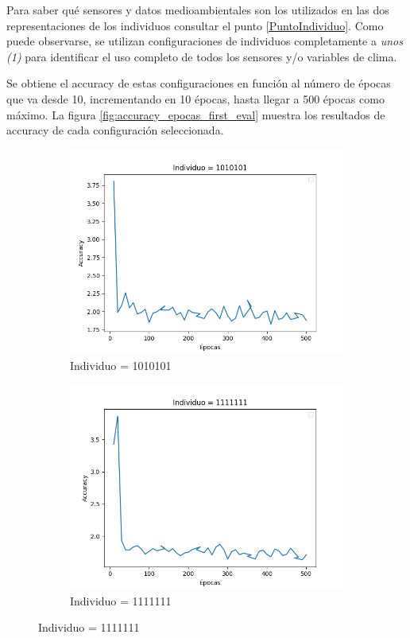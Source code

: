 Para saber qué sensores y datos medioambientales son los utilizados en las dos representaciones de los individuos consultar el punto \ref{PuntoIndividuo}. Como puede observarse, se utilizan configuraciones de individuos completamente a \textit{unos (1)} para identificar el uso completo de todos los sensores y/o variables de clima.


Se obtiene el accuracy de estas configuraciones en función al número de épocas que va desde 10, incrementando en 10 épocas, hasta llegar a 500 épocas como máximo. La figura \ref{fig:accuracy_epocas_first_eval} muestra los resultados de accuracy de cada configuración seleccionada.

\begin{figure}[h!]
\begin{subfigure}[b]{0.47\linewidth}
\includegraphics[width=.7\linewidth]{images/Figure_1.png}
\caption{Individuo = 1010101}
\label{fig:individuo_1010101}
\end{subfigure}
\begin{subfigure}[b]{0.47\linewidth}
 \includegraphics[width=.7\linewidth]{images/Figure_2.png}
\caption{Individuo = 1111111}
\label{fig:individuo_1111111}
\end{subfigure}

\end{figure}
